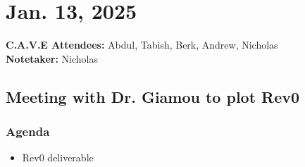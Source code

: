 	\pagebreak
	\section*{Jan. 13, 2025}

	\textbf{C.A.V.E Attendees:} Abdul, Tabish, Berk, Andrew, Nicholas\\
	\textbf{Notetaker:} Nicholas

	\subsection*{Meeting with Dr. Giamou to plot Rev0}
		\subsubsection*{Agenda}
			\begin{itemize}
				\item Rev0 deliverable
			\end{itemize}

